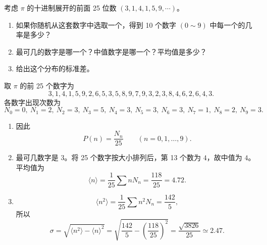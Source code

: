 \begin{question}
考虑 $\pi$ 的十进制展开的前面 25 位数 $(3,1,4,1,5,9,\cdots)$。
\begin{enumerate}
\item 如果你随机从这套数字中选取一个，得到 10 个数字 $(0\sim 9)$ 中每一个的几率是多少？
\item 最可几的数字是哪一个？中值数字是哪一个？平均值是多少？
\item 给出这个分布的标准差。
\end{enumerate}
\end{question}
\begin{solution}
取 $\pi$ 的前 25 个数字为
\[
3,1,4,1,5,9,2,6,5,3,5,8,9,7,9,3,2,3,8,4,6,2,6,4,3.
\]
各数字出现次数为
\[
N_0=0,\ N_1=2,\ N_2=3,\ N_3=5,\ N_4=3,\ N_5=3,\ N_6=3,\ N_7=1,\ N_8=2,\ N_9=3.
\]
\begin{enumerate}
\item 因此
\[
P(n)=\frac{N_n}{25}\qquad(n=0,1,\ldots,9).
\]
\item 最可几数字是 $3$。将 25 个数字按大小排列后，第 13 个数为 $4$，故中值为 $4$。平均值为
\[
\langle n\rangle=\frac{1}{25}\sum nN_n=\frac{118}{25}=4.72.
\]
\item
\[
\langle n^2\rangle=\frac{1}{25}\sum n^2N_n=\frac{142}{5},
\]
所以
\[
\sigma=\sqrt{\langle n^2\rangle-\langle n\rangle^2}
=\sqrt{\frac{142}{5}-\left(\frac{118}{25}\right)^2}
=\frac{\sqrt{3826}}{25}\simeq 2.47.
\]
\end{enumerate}
\end{solution}

